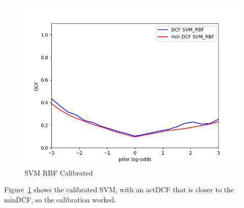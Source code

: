 \documentclass[english]{report}
\begin{document}
\begin{figure}[H]
    \includegraphics[scale=0.5]{../../images/comparison/validation/DCF_SVM_RBF_calibrated}
    \centering
    \caption{SVM RBF Calibrated}
    \label{fig:SVM_RBF_Cal}
\end{figure}
 Figure~\ref{fig:SVM_RBF_Cal} shows the calibrated SVM, with an actDCF that is closer to the minDCF,
 so the calibration worked.
\end{document}
